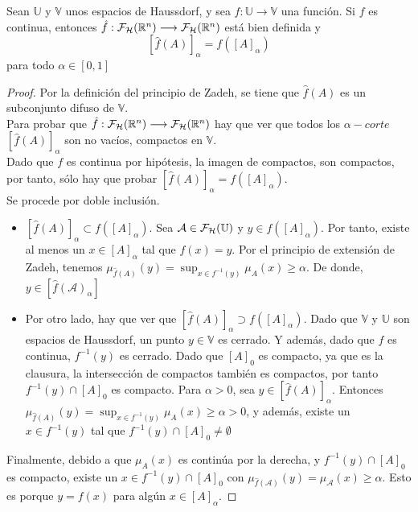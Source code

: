 \begin{teorema}
	Sean $\mathbb{U}$ y $\mathbb{V}$ unos espacios de Haussdorf, y sea $f: \mathbb{U} \longrightarrow \mathbb{V}$ una función. Si $f$ es continua, entonces  $\hat{f} : \mathcal{F}_\mathcal{H}(\mathbb R^n) \longrightarrow \mathcal{F}_\mathcal{H}(\mathbb R^n)$ está bien definida y $$[\hat{f}(A)]_\alpha = f([A]_\alpha)$$
	para todo $\alpha \in [0, 1]$
\end{teorema}

\begin{proof}
	Por la definición del principio de Zadeh, se tiene que $\hat{f}(A)$ es un subconjunto difuso de $\mathbb{V}$. \\
	Para probar que $\hat{f} : \mathcal{F}_\mathcal{H}(\mathbb R^n) \longrightarrow \mathcal{F}_\mathcal{H}(\mathbb R^n)$ hay que ver que todos los $\alpha-corte$ $[\hat{f}(A)]_\alpha$ son no vacíos, compactos en $\mathbb{V}$. \\
	Dado que $f$ es continua por hipótesis, la imagen de compactos, son compactos, por tanto, sólo hay que probar $[\hat{f}(A)]_\alpha = f([A]_\alpha)$. \\
	Se procede por doble inclusión.
	
	\begin{itemize}
		\item $[\hat{f}(A)]_\alpha \subset f([A]_\alpha)$. Sea $\mathcal{A} \in \mathcal{F}_\mathcal{H}(\mathbb U)$ y $y \in f([A]_\alpha)$. Por tanto, existe al menos un $x \in [A]_\alpha$ tal que $f(x)=y$. Por el principio de extensión de Zadeh, tenemos $\mu_{\hat{f}(A)}(y)=\sup_{x\in f^{-1}(y)} \mu_A(x) \geq \alpha$. De donde, $y \in [\hat{f}(\mathcal{A})_\alpha]$
		\item Por otro lado, hay que ver que $[\hat{f}(A)]_\alpha \supset f([A]_\alpha)$. Dado que $\mathbb{V}$ y $\mathbb{U}$ son espacios de Haussdorf, un punto $y \in \mathbb{V}$ es cerrado. Y además, dado que $f$ es continua, $f^{-1}(y)$ es cerrado. Dado que $[A]_0$ es compacto, ya que es la clausura, la intersección de compactos también es compactos, por tanto $f^{-1}(y) \cap [A]_0$ es compacto. Para $\alpha>0$, sea $y \in [\hat{f}(A)]_\alpha$. Entonces $\mu_{\hat{f}(A)}(y)=\sup_{x\in f^{-1}(y)} \mu_A(x) \geq \alpha>0$, y además, existe un $x\in f^{-1}(y)$ tal que $f^{-1}(y) \cap [A]_0 \neq \emptyset$
	\end{itemize}
	Finalmente, debido a que $\mu_A(x)$ es continúa por la derecha, y $f^{-1}(y) \cap [A]_0$ es compacto, existe un $x \in f^{-1}(y) \cap [A]_0$ con $\mu_{\hat{f}(\mathcal{A})}(y)=\mu_{\mathcal{A}}(x) \geq \alpha$. Esto es porque $y=f(x)$ para algún $x \in [A]_\alpha$.
	

\end{proof}

